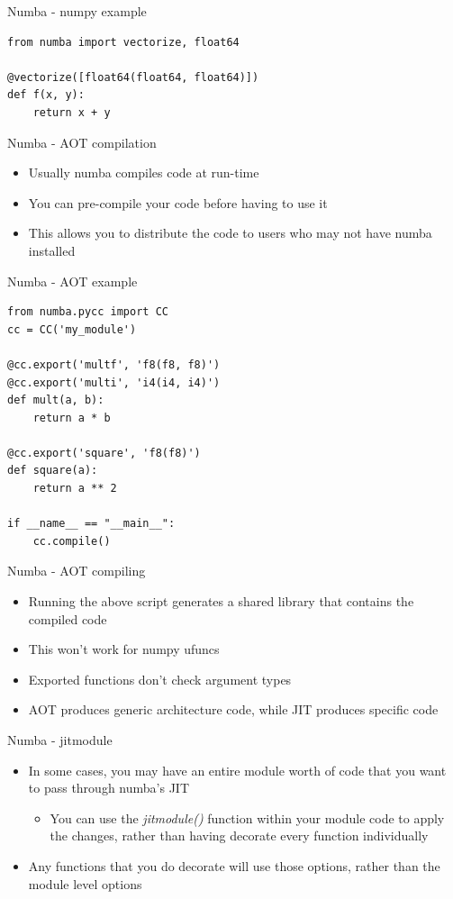 \documentclass[presentation]{beamer}
\begin{document}
\begin{frame}[label=numba---numpy-example,fragile]{Numba - numpy example}
 \begin{verbatim}
from numba import vectorize, float64

@vectorize([float64(float64, float64)])
def f(x, y):
    return x + y
\end{verbatim}
\end{frame}
\begin{frame}[label=numba---aot-compilation]{Numba - AOT compilation}
\begin{itemize}
\item Usually numba compiles code at run-time
\item You can pre-compile your code before having to use it
\item This allows you to distribute the code to users who may not have numba
installed
\end{itemize}
\end{frame}
\begin{frame}[label=numba---aot-example,fragile]{Numba - AOT example}
 \begin{verbatim}
from numba.pycc import CC
cc = CC('my_module')

@cc.export('multf', 'f8(f8, f8)')
@cc.export('multi', 'i4(i4, i4)')
def mult(a, b):
    return a * b

@cc.export('square', 'f8(f8)')
def square(a):
    return a ** 2

if __name__ == "__main__":
    cc.compile()
\end{verbatim}
\end{frame}
\begin{frame}[label=numba---aot-compiling]{Numba - AOT compiling}
\begin{itemize}
\item Running the above script generates a shared library that contains the
compiled code
\item This won't work for numpy ufuncs
\item Exported functions don't check argument types
\item AOT produces generic architecture code, while JIT produces specific
code
\end{itemize}
\end{frame}
\begin{frame}[label=numba---jit_module]{Numba - jit\textunderscore module}
\begin{itemize}
\item In some cases, you may have an entire module worth of code that you
want to pass through numba's JIT
\begin{itemize}
\item You can use the \textit{jit\textunderscore module()} function within your module code to
apply the changes, rather than having decorate every function
individually
\end{itemize}
\item Any functions that you do decorate will use those options, rather than
the module level options
\end{itemize}
\end{frame}
\end{document}
